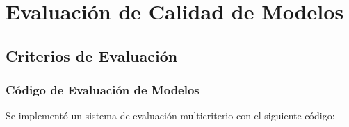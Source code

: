 \documentclass[12pt,letterpaper]{article}
\begin{document}
\section{Evaluación de Calidad de Modelos}

\subsection{Criterios de Evaluación}

\subsubsection{Código de Evaluación de Modelos}

Se implementó un sistema de evaluación multicriterio con el siguiente código:
\end{document}
